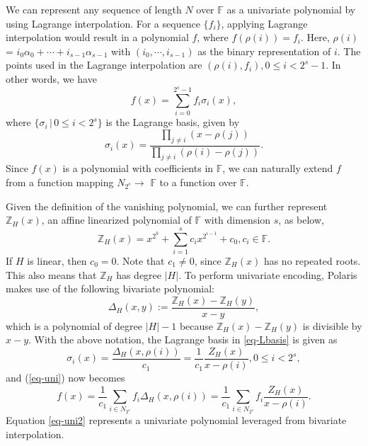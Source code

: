 We can represent any sequence of length $N$ over $\mathbb{F}$ as a univariate polynomial by using Lagrange interpolation. For a sequence $\{f_i\}$, applying Lagrange interpolation would result in a polynomial $f$, where $f(\rho(i))=f_i$. Here, $\rho(i)$  = $i_0 \alpha_0+\cdots + i_{s-1}  \alpha_{s-1}$ with $(i_0, \cdots, i_{s-1})$ as the binary representation of $i$. The  points used in the Lagrange interpolation are  
$(\rho(i), f_i), 0\le i<2^s-1$.
In other words, we have
\begin{equation}\label{eq-uni}
	f(x) = \sum_{i=0}^{2^s-1} f_i \sigma_i(x),
\end{equation}
where $\{\sigma_i \,|\, 0\le i<2^s\}$ is the Lagrange basis, given by 
\begin{equation}\label{eq-Lbasis}
	\sigma_i(x) = \frac{\prod_{j\ne i} (x-\rho(j))}{\prod_{j\ne i} (\rho(i)-\rho(j))}. 
\end{equation}
Since $f(x)$ is a polynomial with coefficients in $\mathbb{F}$, we can naturally extend $f$ from a function mapping $N_{2^s} \rightarrow$  $\mathbb{F}$ to a function over $\mathbb{F}$.

Given the definition of the vanishing polynomial, we can further represent $\mathbb{Z}_H(x)$, an affine linearized polynomial of $\mathbb{F}$ with dimension $s$, as below,
\begin{equation*}\label{eq-defZx2}
	\mathbb{Z}_H(x)=x^{2^k}+\sum_{i=1}^{s}c_ix^{2^{i-1}}+c_0, c_i\in \mathbb{F}.  
\end{equation*}
If $H$ is linear, then $c_0 = 0$. Note that $c_1 \neq 0$, since $\mathbb{Z}_H(x)$ has no repeated roots. This also means that $\mathbb{Z}_H$ has degree $|H|$. 
To perform univariate encoding, Polaris makes use of the following bivariate polynomial: 
\begin{equation}\label{eq-Delta}
	\Delta_H(x,y):=\frac{\mathbb{Z}_H(x)-\mathbb{Z}_H(y)}{x-y},
\end{equation}
which is a polynomial of degree $|H|-1$ because $\mathbb{Z}_H(x)-\mathbb{Z}_H(y)$ is divisible by $x-y$. 
With the above notation,  the Lagrange basis in \ref{eq-Lbasis} is given as 
\[
\sigma_i(x) = \frac{\Delta_H(x,\rho(i))}{c_1} = \frac{1}{c_1} \frac{Z_H(x)}{x-\rho(i)}, 0\le i<2^s,
\]
and (\ref{eq-uni}) now becomes
\begin{equation}\label{eq-uni2}
	f(x) = \frac{1}{c_1} \sum_{i\in N_{2^s}} f_i \Delta_H(x,\rho(i)) = \frac{1}{c_1} \sum_{i\in N_{2^s}} f_i  \frac{Z_H(x)}{x-\rho(i)}.
\end{equation}
Equation \eqref{eq-uni2} represents a univariate polynomial leveraged from bivariate interpolation.

